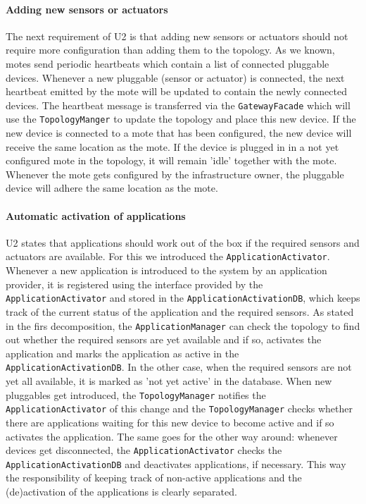 \documentclass[english]{sareport}
\begin{document}
\paragraph{Adding new sensors or actuators}
The next requirement of U2 is that adding new sensors or actuators should not require more configuration than adding them to the topology. As we known, motes send periodic heartbeats which contain a list of connected pluggable devices. Whenever a new pluggable (sensor or actuator) is connected, the next heartbeat emitted by the mote will be updated to contain the newly connected devices. The heartbeat message is transferred via the \texttt{GatewayFacade} which will use the \texttt{TopologyManger} to update the topology and place this new device. If the new device is connected to a mote that has been configured, the new device will receive the same location as the mote. If the device is plugged in in a not yet configured mote in the topology, it will remain 'idle' together with the mote. Whenever the mote gets configured by the infrastructure owner, the pluggable device will adhere the same location as the mote.

\paragraph{Automatic activation of applications}
U2 states that applications should work out of the box if the required sensors and actuators are available. For this we introduced the \texttt{ApplicationActivator}. Whenever a new application is introduced to the system by an application provider, it is registered using the interface provided by the \texttt{ApplicationActivator} and stored in the \texttt{ApplicationActivationDB}, which keeps track of the current status of the application and the required sensors. As stated in the firs decomposition, the \texttt{ApplicationManager} can check the topology to find out whether the required sensors are yet available and if so, activates the application and marks the application as active in the \texttt{ApplicationActivationDB}. In the other case, when the required sensors are not yet all available, it is marked as 'not yet active' in the database. When new pluggables get introduced, the \texttt{TopologyManager} notifies the \texttt{ApplicationActivator} of this change and the \texttt{TopologyManager} checks whether there are applications waiting for this new device to become active and if so activates the application. The same goes for the other way around: whenever devices get disconnected, the \texttt{ApplicationActivator} checks the \texttt{ApplicationActivationDB} and deactivates applications, if necessary. This way the responsibility of keeping track of non-active applications and the (de)activation of the applications is clearly separated.
\end{document}
